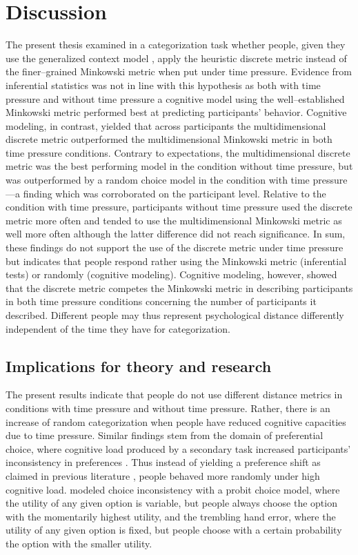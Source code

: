 \documentclass[a4paper,man,natbib]{apa6}
\begin{document}
\section{Discussion}
The present thesis examined in a categorization task whether people, given they use the generalized context model \citep{nosofsky1986attention}, apply the heuristic discrete metric instead of the finer--grained Minkowski metric when put under time pressure. Evidence from inferential statistics was not in line with this hypothesis as both with time pressure and without time pressure a cognitive model using the well--established Minkowski metric performed best at predicting participants' behavior. Cognitive modeling, in contrast, yielded that across participants the multidimensional discrete metric outperformed the multidimensional Minkowski metric in both time pressure conditions. Contrary to expectations, the multidimensional discrete metric was the best performing model in the condition without time pressure, but was outperformed by a random choice model in the condition with time pressure---a finding which was corroborated on the participant level. Relative to the condition with time pressure, participants without time pressure used the discrete metric more often and tended to use the multidimensional Minkowski metric as well more often although the latter difference did not reach significance. In sum, these findings do not support the use of the discrete metric under time pressure but indicates that people respond rather using the Minkowski metric (inferential tests) or randomly (cognitive modeling). Cognitive modeling, however, showed that the discrete metric competes the Minkowski metric in describing participants in both time pressure conditions concerning the number of participants it described. Different people may thus represent psychological distance differently independent of the time they have for categorization.

\subsection{Implications for theory and research}
The present results indicate that people do not use different distance metrics in conditions with time pressure and without time pressure. Rather, there is an increase of random categorization when people have reduced cognitive capacities due to time pressure. Similar findings stem from the domain of preferential choice, where cognitive load produced by a secondary task increased participants' inconsistency in preferences \citep{olschewski2018taxing, burks2009cognitive}. Thus instead of yielding a preference shift as claimed in previous literature \citep{burks2009cognitive, benjamin2013behavioral, deck2015effect, schulz2014affect}, people behaved more randomly under high cognitive load. \cite{olschewski2018taxing} modeled choice inconsistency with a probit choice model, where the utility of any given option is variable, but people always choose the option with the momentarily highest utility, and the trembling hand error, where the utility of any given option is fixed, but people choose with a certain probability the option with the smaller utility. 
\end{document}
